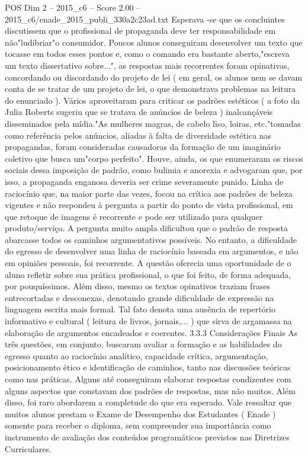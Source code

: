 \begin{textsample}{POS Dim 2 – 2015\_c6 – Score 2.00 – 2015\_c6/enade\_2015\_publi\_330a2c23ad.txt}
Esperava -se que os concluintes discutissem que o profissional de propaganda deve ter responsabilidade em não"ludibriar"o consumidor.
Poucos alunos conseguiram desenvolver um texto que tocasse em todos esses pontos e, como o comando era bastante aberto,"escreva um texto dissertativo sobre...", as respostas mais recorrentes foram opinativas, concordando ou discordando do projeto de lei ( em geral, os alunos nem se davam conta de se tratar de um projeto de lei, o que demonstrava problemas na leitura do enunciado ).
Vários aproveitaram para criticar os padrões estéticos ( a foto da Julia Roberts sugeriu que se tratava de anúncios de beleza ) inalcançáveis disseminados pela mídia."As mulheres magras, de cabelo liso, loiras, etc."tomadas como referência pelos anúncios, aliadas à falta de diversidade estética nas propagandas, foram consideradas causadoras da formação de um imaginário coletivo que busca um"corpo perfeito".
Houve, ainda, os que enumeraram os riscos sociais dessa imposição de padrão, como bulimia e anorexia e advogaram que, por isso, a propaganda enganosa deveria ser crime severamente punido.
Linha de raciocínio que, na maior parte das vezes, focou na crítica aos padrões de beleza vigentes e não respondeu à pergunta a partir do ponto de vista profissional, em que retoque de imagens é recorrente e pode ser utilizado para qualquer produto/serviço.
A pergunta muito ampla dificultou que o padrão de resposta abarcasse todos os caminhos argumentativos possíveis.
No entanto, a dificuldade do egresso de desenvolver uma linha de raciocínio baseada em argumentos, e não em opiniões pessoais, foi recorrente.
A questão oferecia uma oportunidade de o aluno refletir sobre sua prática profissional, o que foi feito, de forma adequada, por pouquíssimos.
Além disso, mesmo os textos opinativos traziam frases entrecortadas e desconexas, denotando grande dificuldade de expressão na linguagem escrita mais formal.
Tal fato denota uma ausência de repertório informativo e cultural ( leitura de livros, jornais,... ) que sirva de argamassa na elaboração de argumentos encadeados e coerentes. 3.3.3 Considerações Finais As três questões, em conjunto, buscaram avaliar a formação e as habilidades do egresso quanto ao raciocínio analítico, capacidade crítica, argumentação, posicionamento ético e identificação de caminhos, tanto nas discussões teóricas como nas práticas.
Alguns até conseguiram elaborar respostas condizentes com alguns aspectos que constavam dos padrões de respostas, mas não muitos.
Além disso, foi raro abordarem a completude do que era esperado.
Vale ressaltar que muitos alunos prestam o Exame de Desempenho dos Estudantes ( Enade ) somente para receber o diploma, sem compreender sua importância como instrumento de avaliação dos conteúdos programáticos previstos nas Diretrizes Curriculares.

\end{textsample}
